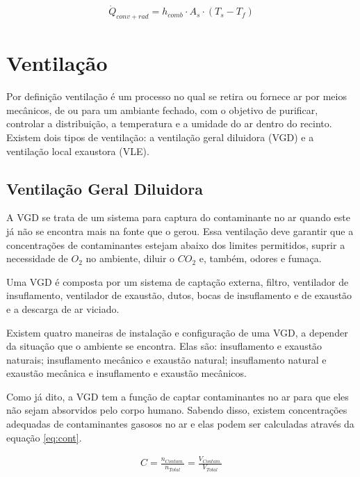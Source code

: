 \documentclass[acronym,symbols]{fei}
\begin{document}
\begin{equation} \label{eq:Combinado}
\begin{aligned}
    \dot{Q}_{conv+rad}=h_{comb} \cdot A_{s} \cdot (T_{s}-T_{f})
\end{aligned}
\end{equation}

\section{Ventilação} \label{ventilação}

Por definição ventilação é um processo no qual se retira ou fornece ar por meios mecânicos, de ou para um ambiante fechado, com o objetivo de purificar, controlar a distribuição, a temperatura e a umidade do ar dentro do recinto. %
Existem dois tipos de ventilação: a ventilação geral diluidora (VGD) e a ventilação local exaustora (VLE). 

\subsection{Ventilação Geral Diluidora} \label{VGD}
A VGD se trata de um sistema para captura do contaminante no ar quando este já não se encontra mais na fonte que o gerou. Essa ventilação deve garantir que a concentrações de contaminantes estejam abaixo dos limites permitidos, suprir a necessidade de $O_2$ no ambiente, diluir o $CO_2$ e, também, odores e fumaça.

Uma VGD é composta por um sistema de captação externa, filtro, ventilador de insuflamento, ventilador de exaustão, dutos, bocas de insuflamento e de exaustão e a descarga de ar viciado.

Existem quatro maneiras de instalação e configuração de uma VGD, a depender da situação que o ambiente se encontra. Elas são: insuflamento e exaustão naturais; insuflamento mecânico e exaustão natural; insuflamento natural e exaustão mecânica e insuflamento e exaustão mecânicos.

Como já dito, a VGD tem a função de captar contaminantes no ar para que eles não sejam absorvidos pelo corpo humano. Sabendo disso, existem concentrações adequadas de contaminantes gasosos no ar e elas podem ser calculadas através da equação \ref{eq:cont}.

\begin{equation} \label{eq:cont}
\begin{aligned}
    C=\frac{n_{Contam.}}{n_{Total}}=\frac{V_{Contam.}}{V_{Total}}
\end{aligned}
\end{equation}
\end{document}
